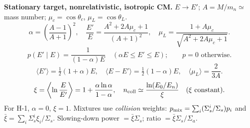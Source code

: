 \begin{handoutcolumns}
\textbf{Stationary target, nonrelativistic, isotropic CM.}
$E\to E'$; $A=M/m_n\simeq$ mass number;
$\mu_c=\cos\theta_c$, $\mu_L=\cos\theta_L$.
\[
 \alpha=\left(\frac{A-1}{A+1}\right)^2,\quad
 \frac{E'}E=\frac{A^2+2A\mu_c+1}{(A+1)^2},\quad
 \mu_L=\frac{1+A\mu_c}{\sqrt{A^2+2A\mu_c+1}}.
\]
\[
 p(E'\mid E)=\frac{1}{(1-\alpha)E}\quad(\alpha E\le E'\le E);
 \qquad p=0\text{ otherwise}.
\]
\[
 \langle E'\rangle=\tfrac12(1+\alpha)E,\quad
 \langle E-E'\rangle=\tfrac12(1-\alpha)E,\quad
 \langle\mu_L\rangle=\frac{2}{3A}.
\]
\[
 \xi=\left\langle\ln\frac{E}{E'}\right\rangle
 =1+\frac{\alpha\ln\alpha}{1-\alpha},\quad
 n_{\rm coll}\simeq\frac{\ln(E_0/E_n)}{\xi}\quad(\xi\text{ constant}).
\]
For H-1, $\alpha=0$, $\xi=1$. Mixtures use \emph{collision} weights:
$p_{\rm mix}=\sum_i(\Sigma_s^i/\Sigma_s)p_i$ and
$\bar\xi=\sum_i\Sigma_s^i\xi_i/\Sigma_s$.
Slowing-down power $=\bar\xi\Sigma_s$; ratio $=\bar\xi\Sigma_s/\Sigma_a$.
\end{handoutcolumns}

